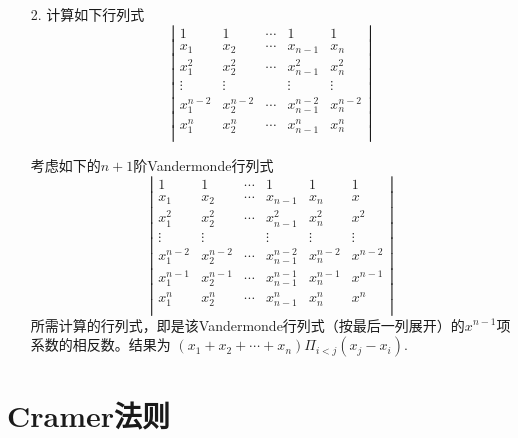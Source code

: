 \begin{itemize}
    \item[2.] 计算如下行列式
    \begin{equation}
    \nonumber
    \left|
        \begin{array}{ccccc}
        1       &1       &\cdots &1 & 1\\
        x_1     &x_2     &\cdots &x_{n-1} & x_n\\
        x_1^2   &x_2^2   &\cdots &x_{n-1}^2 & x_n^2\\
        \vdots  &\vdots  &       &\vdots & \vdots\\
        x_1^{n-2} &x_2^{n-2}     &\cdots &x_{n-1}^{n-2} & x_n^{n-2}\\
        x_1^{n} &x_2^{n}     &\cdots &x_{n-1}^{n} & x_n^{n}\\
        \end{array}
    \right|
    \end{equation} 
	\begin{solution}
	考虑如下的$n+1$阶Vandermonde行列式
	\begin{equation}
    \nonumber
    \left|
        \begin{array}{cccccc}
        1       &1       &\cdots &1 & 1& 1\\
        x_1     &x_2     &\cdots &x_{n-1} & x_n & x\\
        x_1^2   &x_2^2   &\cdots &x_{n-1}^2 & x_n^2 & x^2\\
        \vdots  &\vdots  &       &\vdots & \vdots & \vdots\\
        x_1^{n-2} &x_2^{n-2}     &\cdots &x_{n-1}^{n-2} & x_n^{n-2} & x^{n-2}\\
        x_1^{n-1} &x_2^{n-1}     &\cdots &x_{n-1}^{n-1} & x_n^{n-1} & x^{n-1}\\
        x_1^{n} &x_2^{n}     &\cdots &x_{n-1}^{n} & x_n^{n} & x^n\\
        \end{array}
    \right|
    \end{equation}
	所需计算的行列式，即是该Vandermonde行列式（按最后一列展开）的$x^{n-1}$项系数的相反数。结果为
	$(x_1 + x_2 + \cdots + x_n)\Pi_{i<j}(x_j-x_i)$.
	\end{solution}
	\vspace{2cm}
\end{itemize}

\section{Cramer法则}
